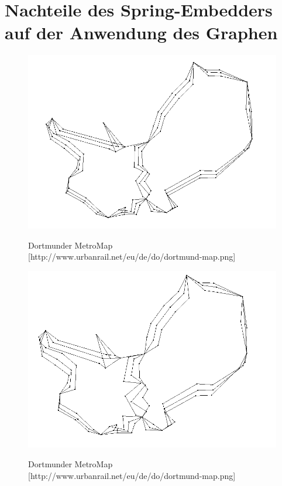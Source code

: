 \section{Nachteile des Spring-Embedders auf der Anwendung des Graphen}
\label{Kapitel_4_-_Unterkapitel_2}

\begin{figure}[t]
	\centering
	{\includegraphics[scale=0.8]{bilder/graph10iterationenreingold}\label{fig_dortmundmap}
	}\\
	\caption[Dortmunder MetroMap]{Dortmunder MetroMap [http://www.urbanrail.net/eu/de/do/dortmund-map.png]}
	\label{fig_dortmundmap}
\end{figure}
\begin{figure}[t]
	\centering
	{\includegraphics[scale=0.8]{bilder/graph25iterationenreingold}\label{fig_dortmundmap}
	}\\
	\caption[Dortmunder MetroMap]{Dortmunder MetroMap [http://www.urbanrail.net/eu/de/do/dortmund-map.png]}
	\label{fig_dortmundmap}
\end{figure}
